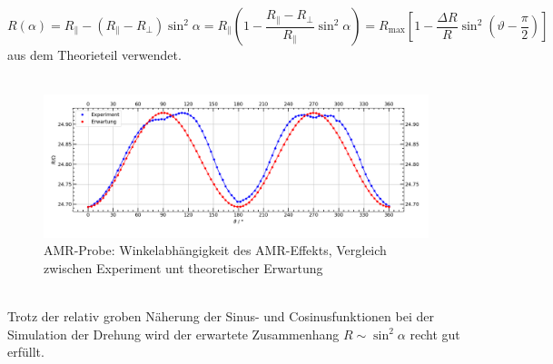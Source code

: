 \documentclass[german,  %
parskip=full,  %
]{scrartcl}
\begin{document}
\[R(\alpha) = R_{\parallel} - (R_{\parallel} - R_{\perp})\sin^2\alpha = R_{\parallel} \left(1 - \frac{R_{\parallel} - R_{\perp}}{R_{\parallel}}\sin^2\alpha\right) = R_{\mathrm{max}}\left[1 - \frac{\Delta R}{R}\sin^2\left(\vartheta - \frac{\pi}{2}\right)\right] \]
aus dem Theorieteil verwendet. \\\\
\begin{figure}[h!]\centering
\includegraphics[width=\textwidth]{Probe1_Drehung_vs_Erwartung.png}
\caption{AMR-Probe: Winkelabhängigkeit des AMR-Effekts, Vergleich zwischen Experiment unt theoretischer Erwartung}
\end{figure} \\
Trotz der relativ groben Näherung der Sinus- und Cosinusfunktionen bei der Simulation der Drehung wird der erwartete Zusammenhang \(R\sim\sin^2\alpha\) recht gut erfüllt.
\end{document}
